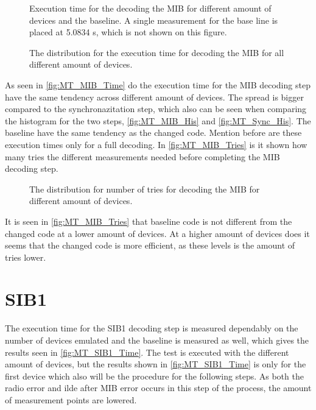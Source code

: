\begin{minipage}{0.48\textwidth}
\begin{figure}[H]
\centering
\resizebox{0.9\textwidth}{!}{
}
\caption{Execution time for the decoding the MIB for different amount of devices and the baseline. A single measurement for the base line is placed at 5.0834 s, which is not shown on this figure.}
\label{fig:MT_MIB_Time}
\end{figure}
\end{minipage}%
\hfill
\begin{minipage}{0.48\textwidth}
\begin{figure}[H]
\centering
\resizebox{0.9\textwidth}{!}{
}
\caption{The distribution for the execution time for decoding the MIB for all different amount of devices.}
\label{fig:MT_MIB_His}
\end{figure}
\end{minipage}

As seen in \autoref{fig:MT_MIB_Time} do the execution time for the MIB decoding step have the same tendency across different amount of devices. The spread is bigger compared to the synchronazitation step, which also can be seen when comparing the histogram for the two steps, \autoref{fig:MT_MIB_His} and \autoref{fig:MT_Sync_His}. The baseline have the same tendency as the changed code. Mention before are these execution times only for a full decoding. In \autoref{fig:MT_MIB_Tries} is it shown how many tries the different measurements needed before completing the MIB decoding step.

\begin{figure}[H]
\centering
\resizebox{0.5\textwidth}{!}{
}
\caption{The distribution for number of tries for decoding the MIB for different amount of devices.}
\label{fig:MT_MIB_Tries}
\end{figure}

It is seen in \autoref{fig:MT_MIB_Tries} that baseline code is not different from the changed code at a lower amount of devices. At a higher amount of devices does it seems that the changed code is more efficient, as these levels is the amount of tries lower.

\section{SIB1}
The execution time for the SIB1 decoding step is measured dependably on the number of devices emulated and the baseline is measured as well, which gives the results seen in \autoref{fig:MT_SIB1_Time}. The test is executed with the different amount of devices, but the results shown in \autoref{fig:MT_SIB1_Time} is only for the first device which also will be the procedure for the following steps. As both the radio error and ilde after MIB error occurs in this step of the process, the amount of measurement points are lowered. 

